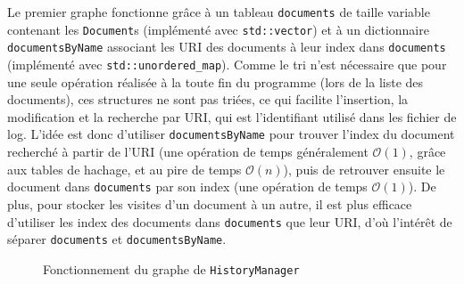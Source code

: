 \documentclass[11pt,a4paper]{article}
\begin{document}
Le premier graphe fonctionne grâce à un tableau \texttt{documents} de taille variable contenant les \texttt{Document}s (implémenté avec \texttt{std::vector}) et à un dictionnaire \texttt{documentsByName} associant les URI des documents à leur index dans \texttt{documents} (implémenté avec \texttt{std::unordered\_map}). Comme le tri n'est nécessaire que pour une seule opération réalisée à la toute fin du programme (lors de la liste des documents), ces structures ne sont pas triées, ce qui facilite l'insertion, la modification et la recherche par URI, qui est l'identifiant utilisé dans les fichier de log. L'idée est donc d'utiliser \texttt{documentsByName} pour trouver l'index du document recherché à partir de l'URI (une opération de temps généralement $ \mathcal{O}(1) $, grâce aux tables de hachage, et au pire de temps $ \mathcal{O}(n) $), puis de retrouver ensuite le document dans \texttt{documents} par son index (une opération de temps $ \mathcal{O}(1) $). De plus, pour stocker les visites d'un document à un autre, il est plus efficace d'utiliser les index des documents dans \texttt{documents} que leur URI, d'où l'intérêt de séparer \texttt{documents} et \texttt{documentsByName}.

\begin{figure}[ht]
	\centering
    \caption{Fonctionnement du graphe de \texttt{HistoryManager}}
    \label{fig:hm_graph}
\end{figure}
\end{document}
